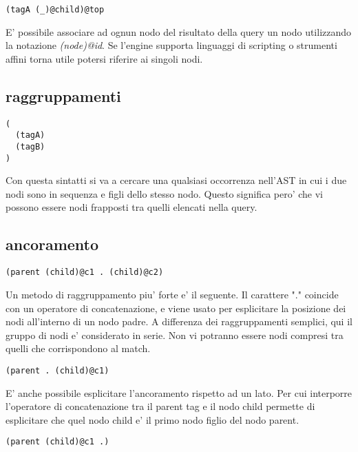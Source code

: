 \begin{Verbatim}[samepage=true]
(tagA (_)@child)@top
\end{Verbatim}

E' possibile associare ad ognun nodo del risultato della query un nodo utilizzando la notazione \emph{(node)@id}.
Se l'engine supporta linguaggi di scripting o strumenti affini torna utile potersi riferire ai singoli nodi.

\subsection{raggruppamenti}

\begin{Verbatim}[samepage=true]
(
  (tagA)
  (tagB)
)
\end{Verbatim}

Con questa sintatti si va a cercare una qualsiasi occorrenza nell'AST in cui i due nodi sono in sequenza e figli dello stesso nodo.
Questo significa pero' che vi possono essere nodi frapposti tra quelli elencati nella query.

\subsection{ancoramento}

\begin{Verbatim}[samepage=true]
(parent (child)@c1 . (child)@c2)
\end{Verbatim}

Un metodo di raggruppamento piu' forte e' il seguente.
Il carattere "." coincide con un operatore di concatenazione, e viene usato per esplicitare la posizione dei nodi all'interno di un nodo padre.
A differenza dei raggruppamenti semplici, qui il gruppo di nodi e' considerato in serie.
Non vi potranno essere nodi compresi tra quelli che corrispondono al match.

\begin{Verbatim}[samepage=true]
(parent . (child)@c1)
\end{Verbatim}

E' anche possibile esplicitare l'ancoramento rispetto ad un lato.
Per cui interporre l'operatore di concatenazione tra il parent tag e il nodo child permette di esplicitare che quel nodo child e' il primo nodo figlio del nodo parent.

\begin{Verbatim}[samepage=true]
(parent (child)@c1 .)
\end{Verbatim}


